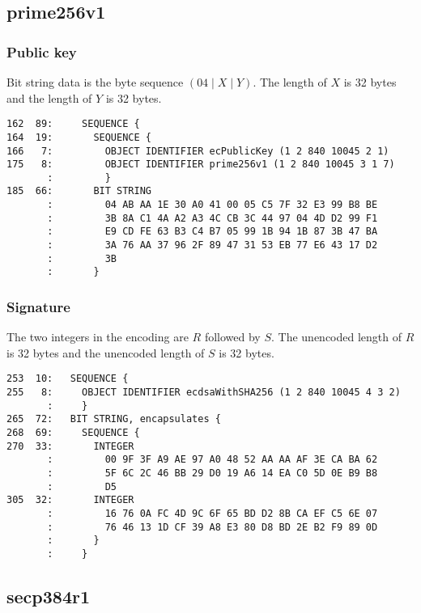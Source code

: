 \documentclass[12pt]{article}
\begin{document}
\newpage
\subsection{prime256v1}

\subsubsection{Public key}

\noindent
Bit string data is the byte sequence $(04\mid X\mid Y)$.
The length of $X$ is 32 bytes and the length of $Y$ is 32 bytes.

\begin{verbatim}
162  89:     SEQUENCE {
164  19:       SEQUENCE {
166   7:         OBJECT IDENTIFIER ecPublicKey (1 2 840 10045 2 1)
175   8:         OBJECT IDENTIFIER prime256v1 (1 2 840 10045 3 1 7)
       :         }
185  66:       BIT STRING
       :         04 AB AA 1E 30 A0 41 00 05 C5 7F 32 E3 99 B8 BE
       :         3B 8A C1 4A A2 A3 4C CB 3C 44 97 04 4D D2 99 F1
       :         E9 CD FE 63 B3 C4 B7 05 99 1B 94 1B 87 3B 47 BA
       :         3A 76 AA 37 96 2F 89 47 31 53 EB 77 E6 43 17 D2
       :         3B
       :       }
\end{verbatim}

\subsubsection{Signature}

\noindent
The two integers in the encoding are $R$ followed by $S$.
The unencoded length of $R$ is 32 bytes and the unencoded length of $S$ is 32 bytes.

\begin{verbatim}
253  10:   SEQUENCE {
255   8:     OBJECT IDENTIFIER ecdsaWithSHA256 (1 2 840 10045 4 3 2)
       :     }
265  72:   BIT STRING, encapsulates {
268  69:     SEQUENCE {
270  33:       INTEGER
       :         00 9F 3F A9 AE 97 A0 48 52 AA AA AF 3E CA BA 62
       :         5F 6C 2C 46 BB 29 D0 19 A6 14 EA C0 5D 0E B9 B8
       :         D5
305  32:       INTEGER
       :         16 76 0A FC 4D 9C 6F 65 BD D2 8B CA EF C5 6E 07
       :         76 46 13 1D CF 39 A8 E3 80 D8 BD 2E B2 F9 89 0D
       :       }
       :     }
\end{verbatim}

\newpage
\subsection{secp384r1}
\end{document}
